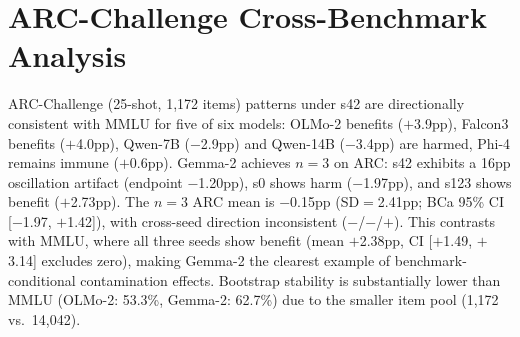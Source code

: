 \appendix
\renewcommand{\thesection}{\AlphAlph{\value{section}}}

\section{ARC-Challenge Cross-Benchmark Analysis}
\label{sec:arc_cross_benchmark}

ARC-Challenge (25-shot, 1{,}172 items) patterns under s42 are directionally consistent with MMLU for five of six models: OLMo-2 benefits ($+$3.9pp), Falcon3 benefits ($+$4.0pp), Qwen-7B ($-$2.9pp) and Qwen-14B ($-$3.4pp) are harmed, Phi-4 remains immune ($+$0.6pp). Gemma-2 achieves $n\!=\!3$ on ARC: s42 exhibits a 16pp oscillation artifact (endpoint $-$1.20pp), s0 shows harm ($-$1.97pp), and s123 shows benefit ($+$2.73pp). The $n\!=\!3$ ARC mean is $-$0.15pp (SD$=$2.41pp; BCa 95\% CI [$-$1.97, $+$1.42]), with cross-seed direction inconsistent ($-$/$-$/$+$). This contrasts with MMLU, where all three seeds show benefit (mean $+$2.38pp, CI [$+$1.49, $+$3.14] excludes zero), making Gemma-2 the clearest example of benchmark-conditional contamination effects. Bootstrap stability is substantially lower than MMLU (OLMo-2: 53.3\%, Gemma-2: 62.7\%) due to the smaller item pool (1{,}172 vs.\ 14{,}042).

